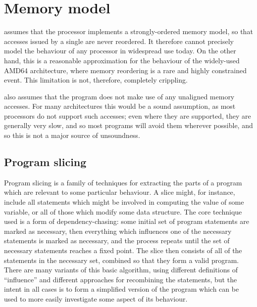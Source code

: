 \section{Memory model}

{\Technique} assumes that the processor implements a strongly-ordered
memory model, so that accesses issued by a single are never reordered.
It therefore cannot precisely model the behaviour of any processor in
widespread use today.  On the other hand, this is a reasonable
approximation for the behaviour of the widely-used AMD64
architecture\needCite{}, where memory reordering is a rare and highly
constrained event.  This limitation is not, therefore, completely
crippling.

{\Technique} also assumes that the program does not make use of any
unaligned memory accesses.  For many architectures this would be a
sound assumption, as most processors do not support such accesses;
even where they are supported, they are generally very slow, and so
most programs will avoid them wherever possible, and so this is not a
major source of unsoundness.




\subsection{Program slicing}

Program slicing is a family of techniques
for extracting the parts of a program which are relevant to some
particular behaviour.  A slice might, for instance, include all
statements which might be involved in computing the value of some
variable, or all of those which modify some data structure.  The core
technique used is a form of dependency-chasing: some initial set of
program statements are marked as necessary, then everything which
influences one of the necessary statements is marked as necessary, and
the process repeats until the set of necessary statements reaches a
fixed point.  The slice then consists of all of the statements in the
necessary set, combined so that they form a valid program.  There are
many variants of this basic algorithm, using different definitions of
``influence'' and different approaches for recombining the statements,
but the intent in all cases is to form a simplified version of the
program which can be used to more easily investigate some aspect of
its behaviour.

